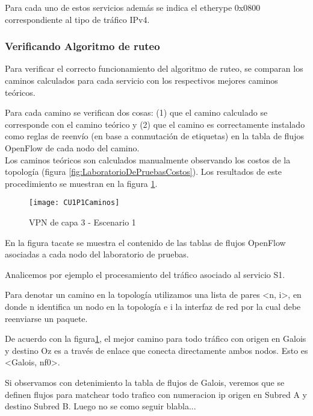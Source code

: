 Para cada uno de estos servicios adem\'as se indica el etherype 0x0800 correspondiente al tipo de tr\'afico IPv4.\\

\subsubsection{Verificando Algoritmo de ruteo}
Para verificar el correcto funcionamiento del algoritmo de ruteo, se comparan los caminos calculados para cada servicio con los respectivos mejores caminos te\'oricos. 

Para cada camino se verifican dos cosas: (1) que el camino calculado se corresponde con el camino te\'orico y (2) que el camino es correctamente instalado como reglas de reenvío (en base a conmutaci\'on de etiquetas) en la tabla de flujos OpenFlow de cada nodo del camino.\\

Los caminos te\'oricos son calculados manualmente observando los costos de la topolog\'ia (figura \ref{fig:LaboratorioDePruebasCostos}). Los resultados de este procedimiento se muestran en la figura
 \ref{fig:CUP1Caminos}.\\

\begin{figure}[ht!] 
\centering    
\texttt{[image: CU1P1Caminos]}
\caption[VPN de capa 3 - Escenario 1]{VPN de capa 3 - Escenario 1}
\label{fig:CUP1Caminos}
\end{figure}

En la figura tacate se muestra el contenido de las tablas de flujos OpenFlow asociadas a cada nodo del laboratorio de pruebas.

Analicemos por ejemplo el procesamiento del tr\'afico asociado al servicio S1. 

Para denotar un camino en la topolog\'ia utilizamos una lista de pares <n, i>, en donde n identifica un nodo en la topolog\'ia e i la interfaz de red por la cual debe reenviarse un paquete.
   
De acuerdo con la figura\ref{fig:CUP1Caminos}, el mejor camino para todo tr\'afico con origen en Galois y destino Oz es a trav\'es de enlace que conecta directamente ambos nodos. Esto es <Galois, nf0>.

Si observamos con detenimiento la tabla de flujos de Galois, veremos que se definen flujos para matchear todo trafico con numeracion ip origen en Subred A y destino Subred B. Luego no se como seguir blabla...\\ 

